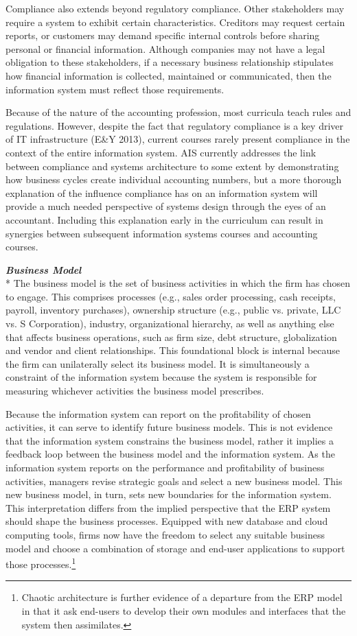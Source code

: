 \documentclass[12pt]{article}
\newcommand{\SubSubSection}[1]{{\centering{}\normalsize{}\textbf{\emph{#1}}}\\*\indent{}}
\begin{document}
Compliance also extends beyond regulatory compliance. Other stakeholders may require a system to exhibit certain characteristics. Creditors may request certain reports, or customers may demand specific internal controls before sharing personal or financial information. Although companies may not have a legal obligation to these stakeholders, if a necessary business relationship stipulates how financial information is collected, maintained or communicated, then the information system must reflect those requirements.

Because of the nature of the accounting profession, most curricula teach rules and regulations. However, despite the fact that regulatory compliance is a key driver of IT infrastructure (E\&Y 2013), current courses rarely present compliance in the context of the entire information system. AIS currently addresses the link between compliance and systems architecture to some extent by demonstrating how business cycles create individual accounting numbers, but a more thorough explanation of the influence compliance has on an information system will provide a much needed perspective of systems design through the eyes of an accountant. Including this explanation early in the curriculum can result in synergies between subsequent information systems courses and accounting courses.

\SubSubSection{Business Model}
The business model is the set of business activities in which the firm has chosen to engage. This comprises processes (e.g., sales order processing, cash receipts, payroll, inventory purchases), ownership structure (e.g., public vs. private, LLC vs. S Corporation), industry, organizational hierarchy, as well as anything else that affects business operations, such as firm size, debt structure, globalization and vendor and client relationships. This foundational block is internal because the firm can unilaterally select its business model. It is simultaneously a constraint of the information system because the system is responsible for measuring whichever activities the business model prescribes.

Because the information system can report on the profitability of chosen activities, it can serve to identify future business models. This is not evidence that the information system constrains the business model, rather it implies a feedback loop between the business model and the information system. As the information system reports on the performance and profitability of business activities, managers revise strategic goals and select a new business model. This new business model, in turn, sets new boundaries for the information system. This interpretation differs from the implied perspective that the ERP system should shape the business processes. Equipped with new database and cloud computing tools, firms now have the freedom to select any suitable business model and choose a combination of storage and end-user applications to support those processes.\footnote{Chaotic architecture is further evidence of a departure from the ERP model in that it ask end-users to develop their own modules and interfaces that the system then assimilates.}
\end{document}
